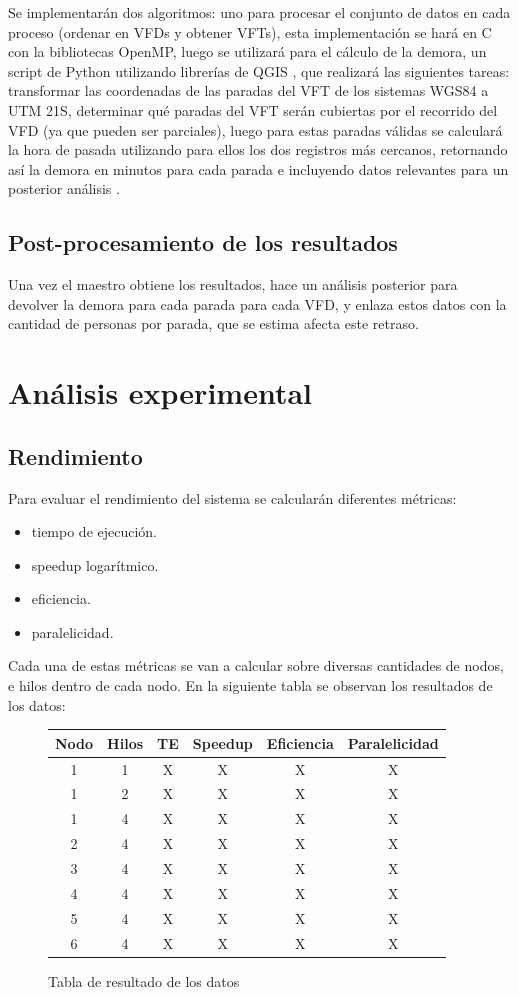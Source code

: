 \documentclass[journal]{IEEEtran}
\begin{document}
Se implementarán dos algoritmos: uno para procesar el
conjunto de datos en cada proceso (ordenar en VFDs y obtener VFTs), esta implementación se hará en C con la bibliotecas OpenMP, luego se utilizará para el cálculo de la demora, un script de Python utilizando librerías de QGIS \cite{qgis}, que realizará las siguientes tareas: transformar las coordenadas de las paradas del VFT de los sistemas WGS84 a UTM 21S, determinar qué paradas del VFT serán cubiertas por el recorrido del VFD (ya que pueden ser parciales), luego para estas paradas válidas se calculará la hora de pasada utilizando para ellos los dos registros más cercanos, retornando así la demora en minutos para cada parada e incluyendo datos relevantes para un posterior análisis . 

\subsection{Post-procesamiento de los resultados}
Una vez el maestro obtiene los resultados, hace un análisis posterior para devolver la demora para cada parada para cada VFD, y enlaza estos datos con la cantidad de personas por parada, que se estima afecta este retraso.

\section{Análisis experimental}
\subsection{Rendimiento}
Para evaluar el rendimiento del sistema se calcularán diferentes métricas:
\begin{itemize}
\item tiempo de ejecución.
\item speedup logarítmico.
\item eficiencia.
\item paralelicidad.
\end{itemize}
Cada una de estas métricas se van a calcular sobre diversas cantidades de nodos, e hilos dentro de cada nodo. En la siguiente tabla se observan los resultados de los datos: 

\begin{figure}
\begin{tabular}{ |c|c|c|c|c|c| } 
\hline
Nodo & Hilos & TE & Speedup & Eficiencia & Paralelicidad \\
\hline
1 & 1 & X & X & X  & X \\
\hline
1 & 2 & X & X & X  & X \\
\hline
1 & 4 & X & X & X  & X \\
\hline
2 & 4 & X & X & X  & X \\
\hline
3 & 4 & X & X & X  & X \\
\hline
4 & 4 & X & X & X  & X \\
\hline
5 & 4 & X & X & X  & X \\
\hline
6 & 4 & X & X & X  & X \\
\hline
\end{tabular}
\caption{Tabla de resultado de los datos}
\end{figure}
\end{document}
